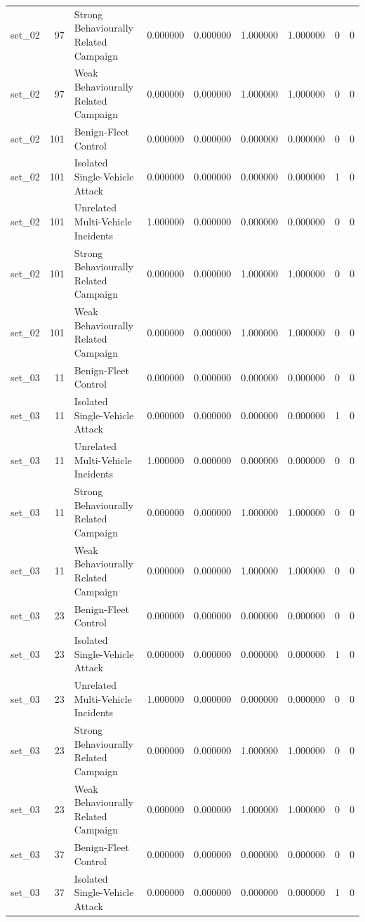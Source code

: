 \begin{tabular}{lrlrrrrrr}
set_02 & 97 & Strong Behaviourally Related Campaign & 0.000000 & 0.000000 & 1.000000 & 1.000000 & 0 & 0 \\
set_02 & 97 & Weak Behaviourally Related Campaign & 0.000000 & 0.000000 & 1.000000 & 1.000000 & 0 & 0 \\
set_02 & 101 & Benign-Fleet Control & 0.000000 & 0.000000 & 0.000000 & 0.000000 & 0 & 0 \\
set_02 & 101 & Isolated Single-Vehicle Attack & 0.000000 & 0.000000 & 0.000000 & 0.000000 & 1 & 0 \\
set_02 & 101 & Unrelated Multi-Vehicle Incidents & 1.000000 & 0.000000 & 0.000000 & 0.000000 & 0 & 0 \\
set_02 & 101 & Strong Behaviourally Related Campaign & 0.000000 & 0.000000 & 1.000000 & 1.000000 & 0 & 0 \\
set_02 & 101 & Weak Behaviourally Related Campaign & 0.000000 & 0.000000 & 1.000000 & 1.000000 & 0 & 0 \\
set_03 & 11 & Benign-Fleet Control & 0.000000 & 0.000000 & 0.000000 & 0.000000 & 0 & 0 \\
set_03 & 11 & Isolated Single-Vehicle Attack & 0.000000 & 0.000000 & 0.000000 & 0.000000 & 1 & 0 \\
set_03 & 11 & Unrelated Multi-Vehicle Incidents & 1.000000 & 0.000000 & 0.000000 & 0.000000 & 0 & 0 \\
set_03 & 11 & Strong Behaviourally Related Campaign & 0.000000 & 0.000000 & 1.000000 & 1.000000 & 0 & 0 \\
set_03 & 11 & Weak Behaviourally Related Campaign & 0.000000 & 0.000000 & 1.000000 & 1.000000 & 0 & 0 \\
set_03 & 23 & Benign-Fleet Control & 0.000000 & 0.000000 & 0.000000 & 0.000000 & 0 & 0 \\
set_03 & 23 & Isolated Single-Vehicle Attack & 0.000000 & 0.000000 & 0.000000 & 0.000000 & 1 & 0 \\
set_03 & 23 & Unrelated Multi-Vehicle Incidents & 1.000000 & 0.000000 & 0.000000 & 0.000000 & 0 & 0 \\
set_03 & 23 & Strong Behaviourally Related Campaign & 0.000000 & 0.000000 & 1.000000 & 1.000000 & 0 & 0 \\
set_03 & 23 & Weak Behaviourally Related Campaign & 0.000000 & 0.000000 & 1.000000 & 1.000000 & 0 & 0 \\
set_03 & 37 & Benign-Fleet Control & 0.000000 & 0.000000 & 0.000000 & 0.000000 & 0 & 0 \\
set_03 & 37 & Isolated Single-Vehicle Attack & 0.000000 & 0.000000 & 0.000000 & 0.000000 & 1 & 0 \\

\end{tabular}
